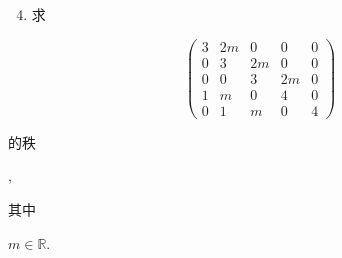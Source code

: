 \documentclass[10pt]{article}
\begin{document}
\begin{enumerate}
  \setcounter{enumi}{3}
  \item \begin{CJK}{UTF8}{mj}求\end{CJK}
\end{enumerate}
$$
\left(\begin{array}{ccccc}
3 & 2 m & 0 & 0 & 0 \\
0 & 3 & 2 m & 0 & 0 \\
0 & 0 & 3 & 2 m & 0 \\
1 & m & 0 & 4 & 0 \\
0 & 1 & m & 0 & 4
\end{array}\right)
$$
\begin{CJK}{UTF8}{mj}的秩\end{CJK}, \begin{CJK}{UTF8}{mj}其中\end{CJK} $m \in \mathbb{R}$.
\end{document}
